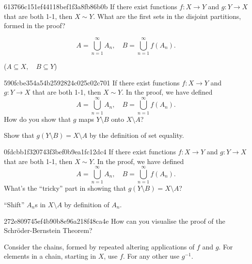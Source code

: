 \begin{note}{613766c151ef44118bef1f3a8fb86b0b}
    If there exist functions \({ f : X \to Y }\) and \({ g : Y \to X }\) that are both 1-1, then \({ X \sim Y }\).
    What are the first sets in the disjoint partitions, formed in the proof?

    \begin{cloze}{1}
        \[
            A = \bigcup_{n=1}^{\infty} A_n, \quad B = \bigcup_{n=1}^{\infty} f(A_n).
        \]

        \begin{center}
            \tiny
            (\({ A \subseteq X, \quad B \subseteq Y }\))
        \end{center}
    \end{cloze}
\end{note}

\begin{note}{590fcbe354a54b2592824c025c02c701}
    If there exist functions \({ f : X \to Y }\) and \({ g : Y \to X }\) that are both 1-1, then \({ X \sim Y }\).
    In the proof, we have defined
    \[
        A = \bigcup_{n=1}^{\infty} A_n, \quad B = \bigcup_{n=1}^{\infty} f(A_n).
    \]
    How do you show that \({ g }\) maps \({ Y \setminus B }\) onto \({ X \setminus A }\)?

    \begin{cloze}{1}
        Show that \({ g(Y \setminus B) = X \setminus A }\) by the definition of set equality.
    \end{cloze}
\end{note}

\begin{note}{0fdcbb1f320743f3bef0b9ea1fc12dc4}
    If there exist functions \({ f : X \to Y }\) and \({ g : Y \to X }\) that are both 1-1, then \({ X \sim Y }\).
    In the proof, we have defined
    \[
        A = \bigcup_{n=1}^{\infty} A_n, \quad B = \bigcup_{n=1}^{\infty} f(A_n).
    \]
    What's the ``tricky'' part in showing that \({ g(Y \setminus B) = X \setminus A }\)?

    \begin{cloze}{1}
        ``Shift'' \({ A_n }\)s in \({ X \setminus A }\) by definition of \({ A_n }\).
    \end{cloze}
\end{note}

\begin{note}{272e809745ef4b90b8e96a218f48ca4e}
    How can you visualise the proof of the Schröder-Bernstein Theorem?

    \begin{cloze}{1}
        Consider the chains, formed by repeated altering applications of \({ f }\) and \({ g }\).
        For elements in a chain, starting in \({ X }\), use \({ f }\). For any other use \({ g^{-1} }\).
    \end{cloze}
\end{note}

